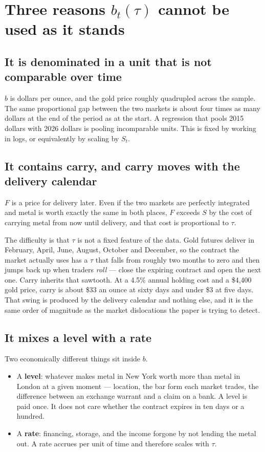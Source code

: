 \documentclass[11pt,a4paper]{article}
\begin{document}
\section{Three reasons $b_t(\tau)$ cannot be used as it stands}
\label{sec:breaks}

\subsection*{It is denominated in a unit that is not comparable over time}

$b$ is dollars per ounce, and the gold price roughly quadrupled across the
sample. The same proportional gap between the two markets is about four times
as many dollars at the end of the period as at the start. A regression that
pools 2015 dollars with 2026 dollars is pooling incomparable units. This is
fixed by working in logs, or equivalently by scaling by $S_t$.

\subsection*{It contains carry, and carry moves with the delivery calendar}

$F$ is a price for delivery later. Even if the two markets are perfectly
integrated and metal is worth exactly the same in both places, $F$ exceeds $S$
by the cost of carrying metal from now until delivery, and that cost is
proportional to $\tau$.

The difficulty is that $\tau$ is not a fixed feature of the data. Gold futures
deliver in February, April, June, August, October and December, so the
contract the market actually uses has a $\tau$ that falls from roughly two
months to zero and then jumps back up when traders \emph{roll} --- close the
expiring contract and open the next one. Carry inherits that sawtooth. At a
4.5\% annual holding cost and a \$4{,}400 gold price, carry is about \$33 an
ounce at sixty days and under \$3 at five days. That swing is produced by the
delivery calendar and nothing else, and it is the same order of magnitude as
the market dislocations the paper is trying to detect.

\subsection*{It mixes a level with a rate}

Two economically different things sit inside $b$.

\begin{itemize}[leftmargin=1.2em,itemsep=2pt,topsep=2pt]
\item A \textbf{level}: whatever makes metal in New York worth more than metal
in London at a given moment --- location, the bar form each market trades,
the difference between an exchange warrant and a claim on a bank. A level is
paid once. It does not care whether the contract expires in ten days or a
hundred.
\item A \textbf{rate}: financing, storage, and the income forgone by not
lending the metal out. A rate accrues per unit of time and therefore scales
with $\tau$.
\end{itemize}
\end{document}
